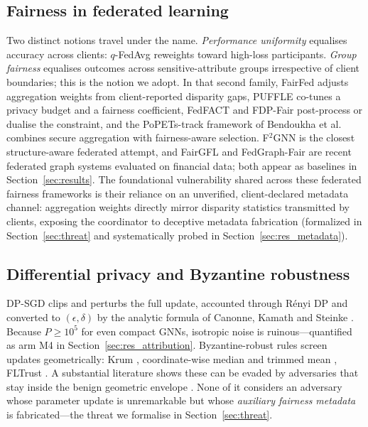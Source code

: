 \documentclass[preprint,12pt]{elsarticle}
\theoremstyle{plain}
\theoremstyle{definition}
\theoremstyle{remark}
\begin{document}
\subsection{Fairness in federated learning}
Two distinct notions travel under the name. \emph{Performance uniformity} equalises accuracy across clients: $q$-FedAvg \cite{li2020fair} reweights toward high-loss participants. \emph{Group fairness} equalises outcomes across sensitive-attribute groups irrespective of client boundaries; this is the notion we adopt. In that second family, FairFed \cite{ezzeldin2023fairfed} adjusts aggregation weights from client-reported disparity gaps, PUFFLE \cite{corbucci2024puffle} co-tunes a privacy budget and a fairness coefficient, FedFACT \cite{fedfact2025} and FDP-Fair \cite{xue2026fdpfair,ling2024feddp} post-process or dualise the constraint, and the PoPETs-track framework of Bendoukha et al.\ \cite{bendoukha2025popets} combines secure aggregation with fairness-aware selection. F$^2$GNN \cite{f2gnn2023} is the closest structure-aware federated attempt, and FairGFL \cite{fairgfl2026} and FedGraph-Fair \cite{fedgraphfair2026} are recent federated graph systems evaluated on financial data; both appear as baselines in Section~\ref{sec:results}. The foundational vulnerability shared across these federated fairness frameworks is their reliance on an unverified, client-declared metadata channel: aggregation weights directly mirror disparity statistics transmitted by clients, exposing the coordinator to deceptive metadata fabrication (formalized in Section~\ref{sec:threat} and systematically probed in Section~\ref{sec:res_metadata}).

\subsection{Differential privacy and Byzantine robustness}
DP-SGD \cite{abadi2016deep,geyer2017differentially,mcmahan2018learning} clips and perturbs the full update, accounted through R\'enyi DP \cite{mironov2017renyi} and converted to $(\epsilon,\delta)$ by the analytic formula of Canonne, Kamath and Steinke \cite{canonne2020discrete}. Because $P \ge 10^5$ for even compact GNNs, isotropic noise is ruinous---quantified as arm M4 in Section~\ref{sec:res_attribution}. Byzantine-robust rules screen updates geometrically: Krum \cite{blanchard2017krum}, coordinate-wise median and trimmed mean \cite{yin2018byzantine}, FLTrust \cite{cao2021fltrust}. A substantial literature shows these can be evaded by adversaries that stay inside the benign geometric envelope \cite{baruch2019little,xie2019fall,mhamdi2018hidden,bagdasaryan2020backdoor}. None of it considers an adversary whose parameter update is unremarkable but whose \emph{auxiliary fairness metadata} is fabricated---the threat we formalise in Section~\ref{sec:threat}.
\end{document}
